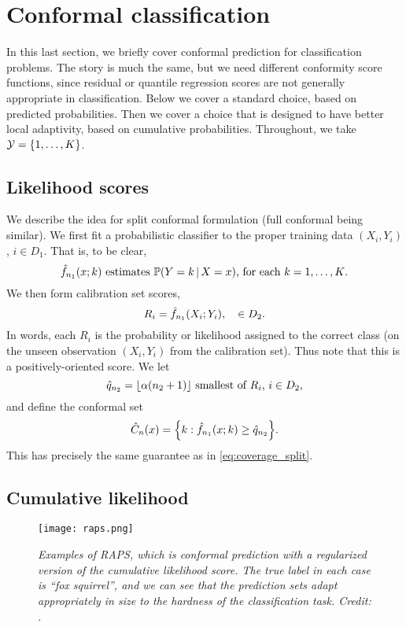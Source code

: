 \documentclass{article}
\begin{document}
\section{Conformal classification}

In this last section, we briefly cover conformal prediction for classification
problems. The story is much the same, but we need different conformity score
functions, since residual or quantile regression scores are not generally
appropriate in classification. Below we cover a standard choice, based on
predicted probabilities. Then we cover a choice that is designed to have better
local adaptivity, based on cumulative probabilities. Throughout, we take $\mathcal{Y} = 
\{1,\dots,K\}$.      

\subsection{Likelihood scores}

We describe the idea for split conformal formulation (full conformal being
similar). We first fit a probabilistic classifier  to the
proper training  data $(X_i,Y_i)$, $i \in D_1$. That is, to be clear, 
\[
\text{$\hat{f}_{n_1}(x; k)$ estimates $\mathbb{P}(Y=k \,|\, X=x)$, for each
  $k=1,\ldots,K$}. 
\]
We then form calibration set scores,
\[
R_i = \hat{f}_{n_1}(X_i; Y_i), \quad \in D_2.
\]
In words, each $R_i$ is the probability or likelihood assigned to the correct
class (on the unseen observation $(X_i,Y_i)$ from the calibration set). Thus
note that this is a positively-oriented score. We let
\[
\text{$\hat{q}_{n_2} = \lfloor \alpha (n_2+1) \rfloor$ smallest of $R_i$, $i \in
  D_2$},  
\]
and define the conformal set
\[
\hat{C}_n(x) = \Big\{ k : \hat{f}_{n_1}(x; k) \geq \hat{q}_{n_2} \Big\}.
\]
This has precisely the same guarantee as in \eqref{eq:coverage_split}.

\subsection{Cumulative likelihood}

\begin{figure}[tb]
\centering
\texttt{[image: raps.png]}
\caption{\it Examples of RAPS, which is conformal prediction with a regularized
  version of the cumulative likelihood score. The true label in each case is
  ``fox squirrel'', and we can see that the prediction sets adapt appropriately
  in size to the hardness of the classification task. Credit:
  \citet{angelopoulos2021uncertainty}.} 
\label{fig:raps}
\end{figure}
\end{document}
